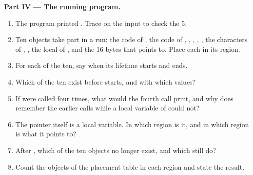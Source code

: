 \begin{problem}
\medskip\noindent\textbf{Part IV --- The running program.}
\begin{enumerate}[resume]
\item The program printed . Trace  on the input to check the 5.
\item Ten objects take part in a run: the code of , the code of , ,
, , , the characters of , , the local  of
, and the 16 bytes that  points to. Place each in its region.
\item For each of the ten, say when its lifetime starts and ends.
\item Which of the ten exist before  starts, and with which values?
\item If  were called four times, what would the fourth call print, and why does
 remember the earlier calls while a local variable of  could not?
\item The pointer  itself is a local variable. In which region is it, and in which region is what it
points to?
\item After , which of the ten objects no longer exist, and which still do?
\item Count the objects of the placement table in each region and state the result.
\end{enumerate}
\end{problem}
